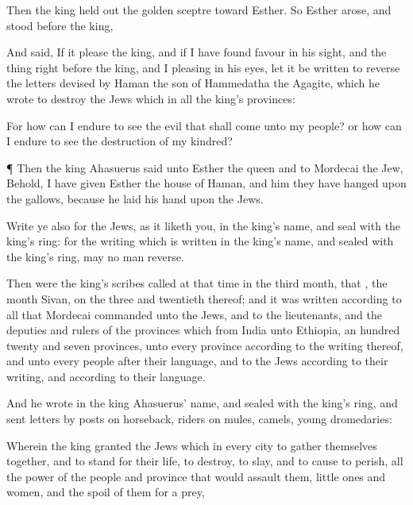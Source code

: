 {Then the
king held
out the
golden
sceptre toward
Esther. So
Esther
arose, and
stood
before the
king,

And
said, If it
please the
king, and if I have
found
favour in his
sight, and the
thing
{}
right
before the
king, and I
{}
pleasing in his
eyes, let it be
written to
reverse the
letters
devised by
Haman the
son of
Hammedatha the
Agagite, which he
wrote to
destroy the
Jews which
{} in all the
king’s
provinces:

For
how can I
endure to
see the
evil that shall
come unto my
people? or
how can I
endure to
see the
destruction of my
kindred?


\par }{\PP {}¶ Then the
king
Ahasuerus
said unto
Esther the
queen and to
Mordecai the
Jew, Behold, I have
given
Esther the
house of
Haman, and him they have
hanged upon the
gallows, because he
laid his
hand upon the
Jews.

Write ye also for the
Jews, as it
liketh
you, in the
king’s
name, and
seal
{} with the
king’s
ring: for the
writing which is
written in the
king’s
name, and
sealed with the
king’s
ring, may no man
reverse.

Then were the
king’s
scribes
called at that
time in the
third
month, that
{}, the
month
Sivan, on the
three and
twentieth
{} thereof; and it was
written according to all that
Mordecai
commanded unto the
Jews, and to the
lieutenants, and the
deputies and
rulers of the
provinces which
{} from
India unto
Ethiopia, an
hundred
twenty and
seven
provinces, unto every
province according to the
writing thereof, and unto every
people after their
language, and to the
Jews according to their
writing, and according to their
language.

And he
wrote in the
king
Ahasuerus’
name, and
sealed
{} with the
king’s
ring, and
sent
letters
by
posts on
horseback,
{}
riders on
mules,
camels,
{}
young
dromedaries:

Wherein the
king
granted the
Jews which
{} in every
city to gather themselves
together, and to
stand for their
life, to
destroy, to
slay, and to cause to
perish, all the
power of the
people and
province that would
assault them,
{} little
ones and
women, and
{} the
spoil of them for a
prey,

}
